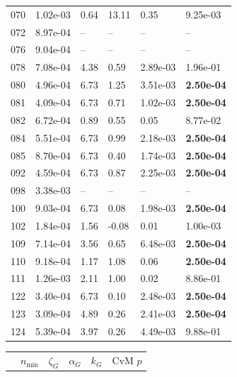 \begin{figure}[htbp!]
{\begin{minipage}[t]{0.48\linewidth}
\begin{tabular}{llllll}
                    070 & 1.02e-03 & 0.64 & 13.11 & 0.35 & 9.25e-03\\
                    072 & 8.97e-04 & -- & -- & -- & --\\
                    076 & 9.04e-04 & -- & -- & -- & --\\
                    078 & 7.08e-04 & 4.38 & 0.59 & 2.89e-03 & 1.96e-01\\
                    080 & 4.96e-04 & 6.73 & 1.25 & 3.51e-03 & \textbf{2.50e-04}\\
                    081 & 4.09e-04 & 6.73 & 0.71 & 1.02e-03 & \textbf{2.50e-04}\\
                    082 & 6.72e-04 & 0.89 & 0.55 & 0.05 & 8.77e-02\\
                    084 & 5.51e-04 & 6.73 & 0.99 & 2.18e-03 & \textbf{2.50e-04}\\
                    085 & 8.70e-04 & 6.73 & 0.40 & 1.74e-03 & \textbf{2.50e-04}\\
                    092 & 4.59e-04 & 6.73 & 0.87 & 2.25e-03 & \textbf{2.50e-04}\\
                    098 & 3.38e-03 & -- & -- & -- & --\\
                    100 & 9.03e-04 & 6.73 & 0.08 & 1.98e-03 & \textbf{2.50e-04}\\
                    102 & 1.84e-04 & 1.56 & -0.08 & 0.01 & 1.00e-03\\
                    109 & 7.14e-04 & 3.56 & 0.65 & 6.48e-03 & \textbf{2.50e-04}\\
                    110 & 9.18e-04 & 1.17 & 1.08 & 0.06 & \textbf{2.50e-04}\\
                    111 & 1.26e-03 & 2.11 & 1.00 & 0.02 & 8.86e-01\\
                    122 & 3.40e-04 & 6.73 & 0.10 & 2.48e-03 & \textbf{2.50e-04}\\
                    123 & 3.09e-04 & 4.89 & 0.26 & 2.41e-03 & \textbf{2.50e-04}\\
                    124 & 5.39e-04 & 3.97 & 0.26 & 4.49e-03 & 9.88e-01\\
        \bottomrule
        \end{tabular}
    \end{minipage}
    \hspace{0.02\linewidth}
    \begin{minipage}[t]{0.48\linewidth}
        \centering
        \begin{tabular}{llllll}
        \toprule
         & $n_{\min}$ & $\zeta_G$ & $\alpha_G$ & $k_G$ & CvM $p$ \\

\end{tabular}
\end{minipage}}
\end{figure}
